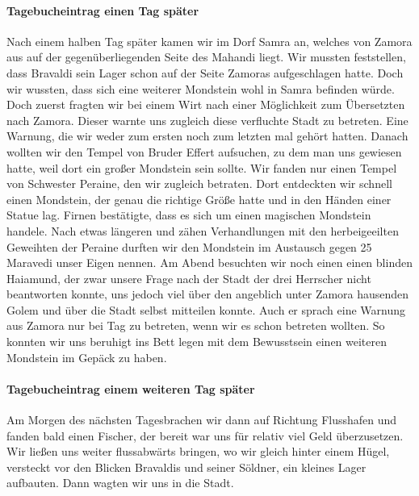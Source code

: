 \paragraph{Tagebucheintrag einen Tag später}
Nach einem halben Tag später kamen wir im Dorf Samra an, welches von Zamora aus auf der gegenüberliegenden Seite des Mahandi liegt. Wir mussten feststellen, dass Bravaldi sein Lager schon auf der Seite Zamoras aufgeschlagen hatte. Doch wir wussten, dass sich eine weiterer Mondstein wohl in Samra befinden würde. Doch zuerst fragten wir bei einem Wirt nach einer Möglichkeit zum Übersetzten nach Zamora. Dieser warnte uns zugleich diese verfluchte Stadt zu betreten. Eine Warnung, die wir weder zum ersten noch zum letzten mal gehört hatten. Danach wollten wir den Tempel von Bruder Effert aufsuchen, zu dem man uns gewiesen hatte, weil dort ein großer Mondstein sein sollte. Wir fanden nur einen Tempel von Schwester Peraine, den wir zugleich betraten. Dort entdeckten wir schnell einen Mondstein, der genau die richtige Größe hatte und in den Händen einer Statue lag. Firnen bestätigte, dass es sich um einen magischen Mondstein handele. Nach etwas längeren und zähen Verhandlungen mit den herbeigeeilten Geweihten der Peraine durften wir den Mondstein im Austausch gegen 25 Maravedi unser Eigen nennen. Am Abend besuchten wir noch einen einen blinden Haiamund, der zwar unsere Frage nach der Stadt der drei Herrscher nicht beantworten konnte, uns jedoch viel über den angeblich unter Zamora hausenden Golem und über die Stadt selbst mitteilen konnte. Auch er sprach eine Warnung aus Zamora nur bei Tag zu betreten, wenn wir es schon betreten wollten. So konnten wir uns beruhigt ins Bett legen mit dem Bewusstsein einen weiteren Mondstein im Gepäck zu haben.

\paragraph{Tagebucheintrag einem weiteren Tag später}
Am Morgen des nächsten Tagesbrachen wir dann auf Richtung Flusshafen und fanden bald einen Fischer, der bereit war uns für relativ viel Geld überzusetzen. Wir ließen uns weiter flussabwärts bringen, wo wir gleich hinter einem Hügel, versteckt vor den Blicken Bravaldis und seiner Söldner, ein kleines Lager aufbauten. Dann wagten wir uns in die Stadt.


